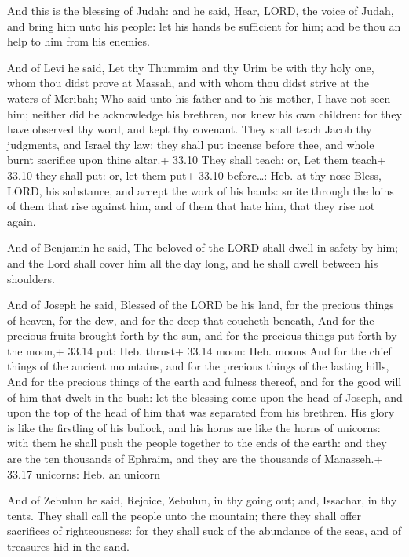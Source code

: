  And this is the blessing of Judah: and he said, Hear,
LORD, the voice of Judah, and bring him unto his people: let his hands
be sufficient for him; and be thou an help to him from his enemies.

 And of Levi he said, Let thy Thummim and thy Urim be with
thy holy one, whom thou didst prove at Massah, and with whom thou didst
strive at the waters of Meribah;  Who said unto his father
and to his mother, I have not seen him; neither did he acknowledge his
brethren, nor knew his own children: for they have observed thy word,
and kept thy covenant.  They shall teach Jacob thy
judgments, and Israel thy law: they shall put incense before thee, and
whole burnt sacrifice upon thine altar.+ 33.10 They shall teach: or, Let
them teach+ 33.10 they shall put: or, let them put+ 33.10 before\ldots:
Heb. at thy nose  Bless, LORD, his substance, and accept
the work of his hands: smite through the loins of them that rise against
him, and of them that hate him, that they rise not again.

 And of Benjamin he said, The beloved of the LORD shall
dwell in safety by him; and the Lord shall cover him all the day long,
and he shall dwell between his shoulders.

 And of Joseph he said, Blessed of the LORD be his land,
for the precious things of heaven, for the dew, and for the deep that
coucheth beneath,  And for the precious fruits brought
forth by the sun, and for the precious things put forth by the moon,+
33.14 put: Heb. thrust+ 33.14 moon: Heb. moons  And for the
chief things of the ancient mountains, and for the precious things of
the lasting hills,  And for the precious things of the
earth and fulness thereof, and for the good will of him that dwelt in
the bush: let the blessing come upon the head of Joseph, and upon the
top of the head of him that was separated from his brethren.
 His glory is like the firstling of his bullock, and his
horns are like the horns of unicorns: with them he shall push the people
together to the ends of the earth: and they are the ten thousands of
Ephraim, and they are the thousands of Manasseh.+ 33.17 unicorns: Heb.
an unicorn

 And of Zebulun he said, Rejoice, Zebulun, in thy going
out; and, Issachar, in thy tents.  They shall call the
people unto the mountain; there they shall offer sacrifices of
righteousness: for they shall suck of the abundance of the seas, and of
treasures hid in the sand.

